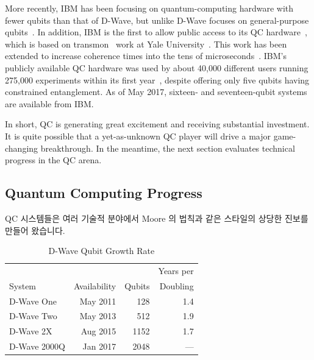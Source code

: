 More recently, IBM has been focusing on quantum-computing hardware with
fewer qubits than that of D-Wave, but unlike D-Wave focuses on
general-purpose
qubits~\cite{BradJones2017IBM-QC-Announce,RobertHackett2017IBM-QC-Announce,AgamShah2017IBM-QC-50-qubit,DarioGill2017IBM-Universal-QC}.
In addition, IBM is the first to allow public access to its QC
hardware~\cite{IBM2016QuantumExperience,ArsTechnica2016IBMQuantumExperience,MikeVizard2017IBM-QC-Cloud},
which is based on transmon~\cite{WikipediaTransMon} work at
Yale University~\cite{PhysRevA.76.042319}.
This work has been extended
to increase coherence times into the tens of
microseconds~\cite{PhysRevLett.107.240501,PhysRevLett.111.080502,PhysRevB.86.100506}.
IBM's publicly available QC hardware was used by about 40,000 different
users running 275,000 experiments within its first
year~\cite{SeanMichaelKerner2017IBM-QC-API},
despite offering only five qubits having constrained entanglement.
As of May 2017, sixteen- and seventeen-qubit systems are available
from IBM.

In short, QC is generating great excitement and receiving substantial
investment.
It is quite possible that a yet-as-unknown QC player will drive a
major game-changing breakthrough.
In the meantime, the next section evaluates technical progress in the
QC arena.
\fi

\subsection{Quantum Computing Progress}
\label{sec:future:Quantum Computing Progress}

QC 시스템들은 여러 기술적 분야에서 Moore 의 법칙과 같은 스타일의 상당한 진보를
만들어 왔습니다.

\begin{table}
\centering\footnotesize
\begin{tabular}{l|r|r|r}
	&	&	& Years per \\
System
	& Availability
		& Qubits
			& Doubling \\
\hline
\hline
D-Wave One
	& May 2011
		& 128
			& 1.4 \\
\hline
D-Wave Two
	& May 2013
		& 512
			& 1.9 \\
\hline
D-Wave 2X
	& Aug 2015
		& 1152
			& 1.7 \\
\hline
D-Wave 2000Q
	& Jan 2017
		& 2048
			& --- \\
\end{tabular}
\caption{D-Wave Qubit Growth Rate}
\label{tab:future:D-Wave Qubit Growth Rate}
\end{table}

